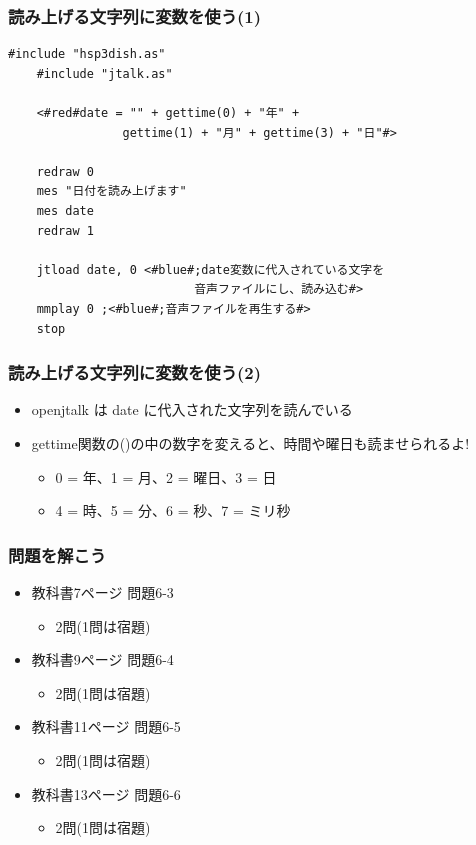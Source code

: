 \documentclass[14pt]{beamer}
\begin{document}
\begin{frame}[fragile]
  \frametitle{読み上げる文字列に変数を使う(1)}
  \begin{lstlisting}[title=readdate.hsp,label=readdate.hsp]
    #include "hsp3dish.as"
    #include "jtalk.as"

    <#red#date = "" + gettime(0) + "年" + 
                gettime(1) + "月" + gettime(3) + "日"#>

    redraw 0
    mes "日付を読み上げます"
    mes date
    redraw 1

    jtload date, 0 <#blue#;date変数に代入されている文字を
                          音声ファイルにし、読み込む#>
    mmplay 0 ;<#blue#;音声ファイルを再生する#>
    stop
  \end{lstlisting}
\end{frame}

\begin{frame}
  \frametitle{読み上げる文字列に変数を使う(2)}
  \begin{itemize}
    \item openjtalk は date に代入された文字列を読んでいる
    \item gettime関数の()の中の数字を変えると、時間や曜日も読ませられるよ!
    \begin{itemize}
      \item 0 = 年、1 = 月、2 = 曜日、3 = 日
      \item 4 = 時、5 = 分、6 = 秒、7 = ミリ秒
    \end{itemize}
  \end{itemize}
\end{frame}


\begin{frame}
  \frametitle{問題を解こう}
  \begin{itemize}
    \item 教科書7ページ 問題6-3
          \begin{itemize}
            \item 2問(1問は宿題)
          \end{itemize}

    \item 教科書9ページ 問題6-4
          \begin{itemize}
            \item 2問(1問は宿題)
          \end{itemize}

    \item 教科書11ページ 問題6-5
          \begin{itemize}
            \item 2問(1問は宿題)
          \end{itemize}

    \item 教科書13ページ 問題6-6
          \begin{itemize}
            \item 2問(1問は宿題)
          \end{itemize}
  \end{itemize}

\end{frame}
\end{document}

